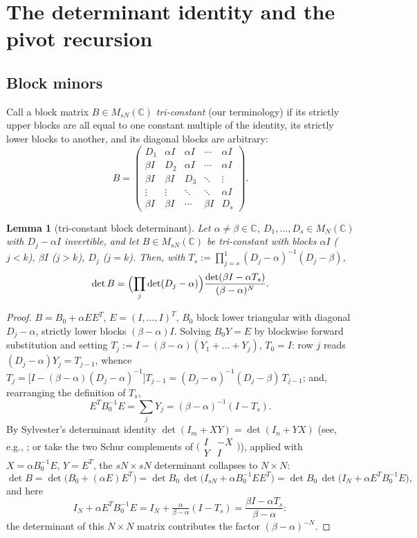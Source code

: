 \documentclass[11pt]{article}
\newtheorem{lemma}[theorem]{Lemma}
\theoremstyle{definition}
\newcommand{\C}{\mathbb C}
\begin{document}
\section{The determinant identity and the pivot recursion}
\label{sec:pivot}
\subsection{Block minors}

Call a block matrix $B\in M_{sN}(\C)$ \emph{tri-constant} (our
terminology) if its strictly upper blocks are all equal to one
constant multiple of the identity, its strictly lower blocks to
another, and its diagonal blocks are arbitrary:
\[
B=\begin{pmatrix}
D_1 & \alpha I & \alpha I & \cdots & \alpha I\\
\beta I & D_2 & \alpha I & \cdots & \alpha I\\
\beta I & \beta I & D_3 & \ddots & \vdots\\
\vdots & \vdots & \ddots & \ddots & \alpha I\\
\beta I & \beta I & \cdots & \beta I & D_s
\end{pmatrix}.
\]

\begin{lemma}[tri-constant block determinant]\label{lem:blocktri}
Let $\alpha\neq\beta\in\C$, $D_1,\dots,D_s\in M_N(\C)$ with $D_j-\alpha I$
invertible, and let $B\in M_{sN}(\C)$ be tri-constant with blocks
$\alpha I$ ($j<k$), $\beta I$ ($j>k$), $D_j$ ($j=k$). Then, with
$T_s:=\prod_{j=s}^{1}(D_j-\alpha)^{-1}(D_j-\beta)$,
\[
\det B=\Bigl(\prod_{j}\det(D_j-\alpha)\Bigr)
\frac{\det(\beta I-\alpha T_s)}{(\beta-\alpha)^{N}} .
\]
\end{lemma}

\begin{proof}
$B=B_0+\alpha EE^{T}$, $E=(I,\dots,I)^{T}$, $B_0$ block lower triangular
with diagonal $D_j-\alpha$, strictly lower blocks $(\beta-\alpha)I$.
Solving $B_0Y=E$ by blockwise forward substitution and setting
$T_j:=I-(\beta-\alpha)(Y_1+\dots+Y_j)$, $T_0=I$: row $j$ reads
$(D_j-\alpha)Y_j=T_{j-1}$, whence
$T_j=\bigl[I-(\beta-\alpha)(D_j-\alpha)^{-1}\bigr]T_{j-1}
=(D_j-\alpha)^{-1}(D_j-\beta)\,T_{j-1}$; and, rearranging the
definition of $T_s$,
\[
E^{T}B_0^{-1}E=\sum_jY_j=(\beta-\alpha)^{-1}(I-T_s).
\]
By Sylvester's determinant identity
$\det(I_m+XY)=\det(I_n+YX)$ (see, e.g., \cite{HJ}; or take the two Schur
complements of $\bigl(\begin{smallmatrix}I&-X\\Y&I
\end{smallmatrix}\bigr)$), applied with $X=\alpha B_0^{-1}E$,
$Y=E^{T}$, the $sN\times sN$ determinant collapses to $N\times N$:
\[
\det B=\det\bigl(B_0+(\alpha E)E^{T}\bigr)
=\det B_0\,\det\bigl(I_{sN}+\alpha B_0^{-1}EE^{T}\bigr)
=\det B_0\,\det\bigl(I_N+\alpha E^{T}B_0^{-1}E\bigr),
\]
and here
\[
I_N+\alpha E^{T}B_0^{-1}E
=I_N+\tfrac{\alpha}{\beta-\alpha}(I-T_s)
=\frac{\beta I-\alpha T_s}{\beta-\alpha}:
\]
the determinant of this $N\times N$ matrix contributes
the factor $(\beta-\alpha)^{-N}$.
\end{proof}
\end{document}
